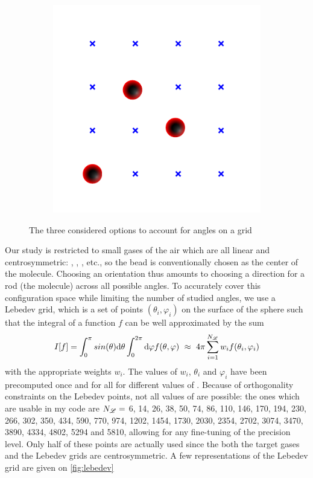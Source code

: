 \documentclass[main.tex]{subfiles}
\begin{document}
\begin{figure}
\begin{subfigure}{0.33\linewidth}
	\end{subfigure}\hfill%
	\begin{subfigure}{0.33\linewidth}
		\includegraphics[width=1.05\linewidth]{figures/gcmc/gridMC_optionC.pdf}
	\end{subfigure}\hfill
	\caption{The three considered options to account for angles on a grid}\label{fig:3options}
\end{figure}

Our study is restricted to small gases of the air which are all linear and centrosymmetric: , , , etc., so the bead is conventionally chosen as the center of the molecule. Choosing an orientation thus amounts to choosing a direction for a rod (the molecule) across all possible angles. To accurately cover this configuration space while limiting the number of studied angles, we use a Lebedev grid, which is a set of \Nleb points $(\theta_i,\varphi_i)$ on the surface of the sphere such that the integral of a function $f$ can be well approximated by the sum
\[I[f] = \int_0^\pi sin(\theta)\text d\theta \int_0^{2\pi}\text d\varphi f(\theta, \varphi)\ \approx\ 4\pi\sum_{i=1}^{N_{\mathscr L}} w_if(\theta_i,\varphi_i)\]
with the appropriate weights $w_i$. The values of $w_i$, $\theta_i$ and $\varphi_i$ have been precomputed once and for all for different values of \Nleb. Because of orthogonality constraints on the Lebedev points, not all values of \Nleb are possible: the ones which are usable in my code are $N_{\mathscr L} =$ 6, 14, 26, 38, 50, 74, 86, 110, 146, 170, 194, 230, 266, 302, 350, 434, 590, 770, 974, 1202, 1454, 1730, 2030, 2354, 2702, 3074, 3470, 3890, 4334, 4802, 5294 and 5810, allowing for any fine-tuning of the precision level. Only half of these points are actually used since the both the target gases and the Lebedev grids are centrosymmetric. A few representations of the Lebedev grid are given on \cref{fig:lebedev}
\end{document}
